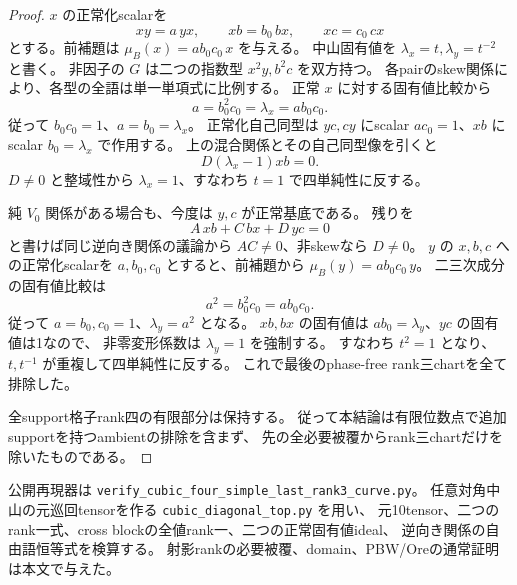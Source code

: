 \begin{proof}
$x$ の正常化scalarを
\[
 xy=a\,yx,\qquad xb=b_0\,bx,\qquad xc=c_0\,cx
\]
とする。前補題は $\mu_B(x)=ab_0c_0\,x$ を与える。
中山固有値を $\lambda_x=t,\lambda_y=t^{-2}$ と書く。
非因子の $G$ は二つの指数型 $x^2y,b^2c$ を双方持つ。
各pairのskew関係により、各型の全語は単一単項式に比例する。
正常 $x$ に対する固有値比較から
\[
 a=b_0^2c_0=\lambda_x=ab_0c_0.
\]
従って $b_0c_0=1$、$a=b_0=\lambda_x$。
正常化自己同型は $yc,cy$ にscalar $ac_0=1$、$xb$ にscalar $b_0=\lambda_x$ で作用する。
上の混合関係とその自己同型像を引くと
\[
 D(\lambda_x-1)xb=0.
\]
$D\ne0$ と整域性から $\lambda_x=1$、すなわち $t=1$ で四単純性に反する。

純 $V_0$ 関係がある場合も、今度は $y,c$ が正常基底である。
残りを
\[
 A\,xb+C\,bx+D\,yc=0
\]
と書けば同じ逆向き関係の議論から $AC\ne0$、非skewなら $D\ne0$。
$y$ の $x,b,c$ への正常化scalarを $a,b_0,c_0$ とすると、前補題から
$\mu_B(y)=ab_0c_0\,y$。
二三次成分の固有値比較は
\[
 a^2=b_0^2c_0=ab_0c_0.
\]
従って $a=b_0,c_0=1$、$\lambda_y=a^2$ となる。
$xb,bx$ の固有値は $ab_0=\lambda_y$、$yc$ の固有値は1なので、
非零変形係数は $\lambda_y=1$ を強制する。
すなわち $t^2=1$ となり、$t,t^{-1}$ が重複して四単純性に反する。
これで最後のphase-free rank三chartを全て排除した。

全support格子rank四の有限部分は保持する。
従って本結論は有限位数点で追加supportを持つambientの排除を含まず、
先の全必要被覆からrank三chartだけを除いたものである。
\end{proof}

公開再現器は \texttt{verify\_cubic\_four\_simple\_last\_rank3\_curve.py}。
任意対角中山の元巡回tensorを作る \texttt{cubic\_diagonal\_top.py} を用い、
元10tensor、二つのrank一式、cross blockの全値rank一、二つの正常固有値ideal、
逆向き関係の自由語恒等式を検算する。
射影rankの必要被覆、domain、PBW/Oreの通常証明は本文で与えた。
